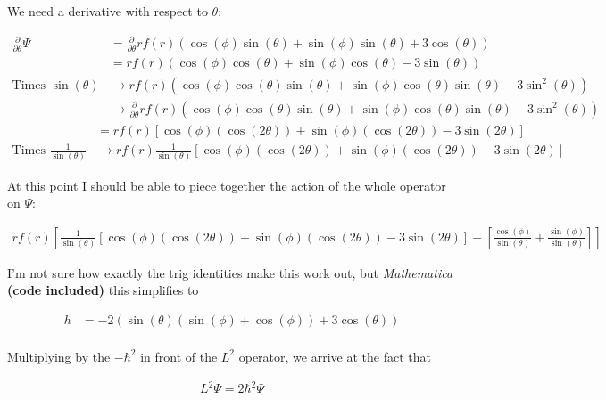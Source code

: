 \documentclass[paper=a4, fontsize=11pt]{scrartcl} %
\numberwithin{equation}{section} %
\numberwithin{figure}{section} %
\numberwithin{table}{section} %
\begin{document}
We need a derivative with respect to $\theta$:

\begin{align}
\frac{\partial}{\partial \theta}\Psi &=  \frac{\partial}{\partial \theta} rf(r)(\cos(\phi)\sin(\theta) + \sin(\phi)\sin(\theta) + 3 \cos(\theta)) \\
&= rf(r)(\cos(\phi)\cos(\theta) + \sin(\phi)\cos(\theta) - 3 \sin(\theta)) \\
\text{Times $\sin(\theta)$} &\rightarrow rf(r)(\cos(\phi)\cos(\theta)\sin(\theta) + \sin(\phi)\cos(\theta)\sin(\theta) - 3 \sin^2(\theta)) \\
&\rightarrow \frac{\partial}{\partial \theta} rf(r)(\cos(\phi)\cos(\theta)\sin(\theta) + \sin(\phi)\cos(\theta)\sin(\theta) - 3 \sin^2(\theta))
\end{align}
\begin{align} 
&= rf(r)\left[\cos(\phi)(\cos(2 \theta)) + \sin(\phi)(\cos(2 \theta)) - 3\sin(2 \theta)\right] \\
\text{Times $\frac{1}{\sin(\theta)}$} &\rightarrow rf(r)\frac{1}{\sin(\theta)} \left[\cos(\phi)(\cos(2 \theta)) + \sin(\phi)(\cos(2 \theta)) - 3\sin(2 \theta)\right]
\end{align}


At this point I should be able to piece together the action of the whole operator on $\Psi$:

\begin{align}
rf(r)\left[ \frac{1}{\sin(\theta)} \left[\cos(\phi)(\cos(2 \theta)) + \sin(\phi)(\cos(2 \theta)) - 3\sin(2 \theta)\right] -  \left[\frac{\cos(\phi)}{\sin(\theta)} + \frac{\sin(\phi)}{\sin(\theta)} \right] \right]
\end{align}

I'm not sure how exactly the trig identities make this work out, but \textit{Mathematica} \textbf{(code included)} this simplifies to


\begin{align}
h&= -2 (\sin (\theta ) (\sin (\phi )+\cos (\phi ))+3 \cos (\theta )) \\
\end{align}

Multiplying by the $-\hbar^2$ in front of the $L^2$ operator, we arrive at the fact that

\begin{align}
L^2 \Psi = 2 \hbar^2 \Psi
\end{align}
\end{document}
